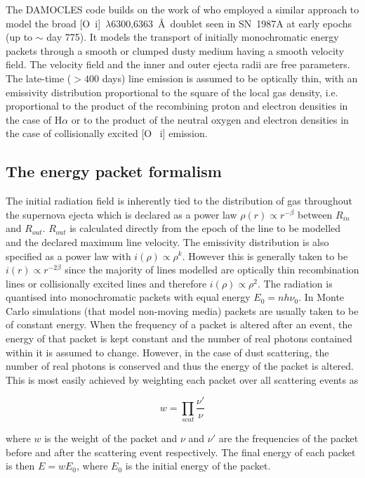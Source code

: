 \documentclass[useAMS,usenatbib,usegraphicx]{mnras}
\begin{document}
The DAMOCLES code builds on the work of \citet{Lucy1989} who employed a 
similar approach to model the broad [O~{\sc i}]~$\lambda$6300,6363~\AA\ doublet 
seen in SN~1987A at early epochs (up to $\sim$ day 775).  It models the 
transport of initially monochromatic energy packets through a smooth or 
clumped dusty medium having a smooth velocity field. The velocity field 
and the inner and outer ejecta radii are free parameters. The late-time 
($> 400$ days) line emission is assumed to be optically thin, with an 
emissivity distribution proportional to the square of the local gas density, i.e. 
proportional to the product of the recombining proton and electron 
densities in the case of H$\alpha$ or to the product of the neutral 
oxygen and electron densities in the case of collisionally excited [O~{\sc 
i}] emission.

\subsection{The energy packet formalism}
\label{packets}

The initial radiation field is inherently tied to the distribution of gas 
throughout the supernova ejecta which is declared as a power law $\rho(r) 
\propto r^{-\beta}$ between $R_{in}$ and $R_{out}$. $R_{out}$ is calculated directly from the epoch of the line to be modelled and the declared maximum line velocity.  The emissivity 
distribution is also specified as a power law with $i(\rho) \propto 
\rho^{k}$.  However this is generally taken to be $i(r) \propto r 
^{-2\beta}$ since the majority of lines modelled are optically thin recombination lines or collisionally excited lines
and therefore $i(\rho) \propto \rho^2$.  The radiation is quantised into 
monochromatic packets with equal energy $E_{0}=nh\nu_{0}$.  In Monte Carlo 
simulations (that model non-moving media) packets are usually taken 
to be of constant energy.  When the frequency of a packet is altered after 
an event, the energy of that packet is kept constant and the number of 
real photons contained within it is assumed to change.  However, in the case 
of dust scattering, the number of real photons is conserved and thus the 
energy of the packet is altered.  This is most easily achieved by 
weighting each packet over all scattering events as 

\begin{equation}
w=\prod_{scat} \frac{\nu'}{\nu}
\end{equation} 

\noindent where $w$ is the weight of the packet and $\nu$ and $\nu'$ are the frequencies of the packet before and after the scattering event respectively.  The final 
energy of each packet is then $E=wE_0$, where $E_0$ is the initial energy 
of the packet.
\end{document}
